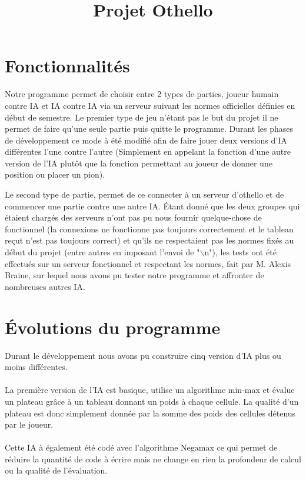 \documentclass[a4paper,10pt]{article}
\title{Projet Othello}
\author{\bsc{Kevin Hivert} \bsc{Ronan Abhamon}}
\date{}
\begin{document}
\maketitle

\section{Fonctionnalités}
\noindent
Notre programme permet de choisir entre 2 types de parties, joueur humain contre IA et IA contre IA via un serveur suivant les normes officielles définies en début de semestre.
Le premier type de jeu n'étant pas le but du projet il ne permet de faire qu'une seule partie puis quitte le programme. Durant les phases de développement ce mode à été modifié afin de faire jouer deux versions d'IA différentes l'une contre l'autre (Simplement en appelant la fonction d'une autre version de l'IA plutôt que la fonction permettant au joueur de donner une position ou placer un pion).
~\par Le second type de partie, permet de ce connecter à un serveur d'othello et de commencer une partie contre une autre IA.
Étant donné que les deux groupes qui étaient chargés des serveurs n'ont pas pu nous fournir quelque-chose de fonctionnel (la connexions ne fonctionne pas toujours correctement et le tableau reçut n'est pas toujours correct) et qu'ils ne respectaient pas les normes fixés au début du projet (entre autres en imposant l'envoi de "$\backslash$n"), les tests ont été effectués sur un serveur fonctionnel et respectant les normes, fait par M. Alexis Braine, sur lequel nous avons pu tester notre programme et affronter de nombreuses autres IA.

\section{Évolutions du programme}
\noindent
Durant le développement nous avons pu construire cinq version d'IA plus ou moins différentes.

\paragraph{}La première version de l'IA est basique, utilise un algorithme min-max et évalue un plateau grâce à un tableau donnant un poids à chaque cellule. La qualité d'un plateau est donc simplement donnée par la somme des poids des cellules détenus par le joueur.

\paragraph{}Cette IA à également été codé avec l'algorithme Negamax ce qui permet de réduire la quantité de code à écrire mais ne change en rien la profondeur de calcul ou la qualité de l'évaluation.
\end{document}
